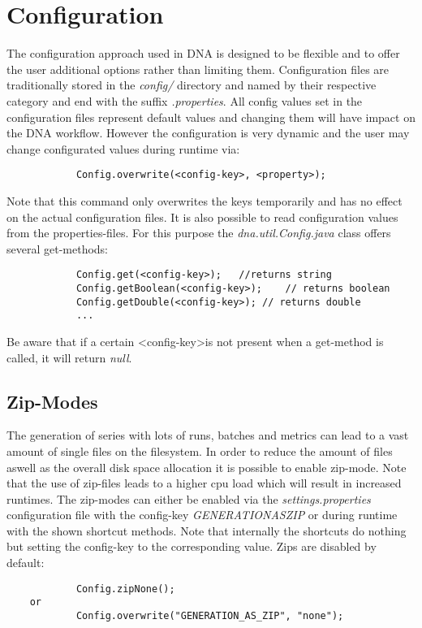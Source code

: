 \chapter{Configuration}
The configuration approach used in DNA is designed to be flexible and to offer the user additional options rather than limiting them. Configuration files are traditionally stored in the \textit{config/} directory and named by their respective category and end with the suffix \textit{.properties}. All config values set in the configuration files represent default values and changing them will have impact on the DNA workflow. However the configuration is very dynamic and the user may change configurated values during runtime via:
\begin{lstlisting}
			Config.overwrite(<config-key>, <property>);
\end{lstlisting}
Note that this command only overwrites the keys temporarily and has no effect on the actual configuration files. It is also possible to read configuration values from the properties-files. For this purpose the \textit{dna.util.Config.java} class offers several get-methods:
\begin{lstlisting}
			Config.get(<config-key>);	//returns string
			Config.getBoolean(<config-key>);	// returns boolean
			Config.getDouble(<config-key>);	// returns double
			...
\end{lstlisting}
Be aware that if a certain \textless config-key\textgreater  is not present when a get-method is called, it will return \textit{null}.

\section{Zip-Modes}
The generation of series with lots of runs, batches and metrics can lead to a vast amount of single files on the filesystem. In order to reduce the amount of files aswell as the overall disk space allocation it is possible to enable zip-mode. Note that the use of zip-files leads to a higher cpu load which will result in increased runtimes. The zip-modes can either be enabled via the \textit{settings.properties} configuration file with the config-key \textit{GENERATION\textunderscore AS\textunderscore ZIP} or during runtime with the shown shortcut methods. Note that internally the shortcuts do nothing but setting the config-key to the corresponding value. Zips are disabled by default:
\begin{lstlisting}
			Config.zipNone();
	or
			Config.overwrite("GENERATION_AS_ZIP", "none");
\end{lstlisting}

